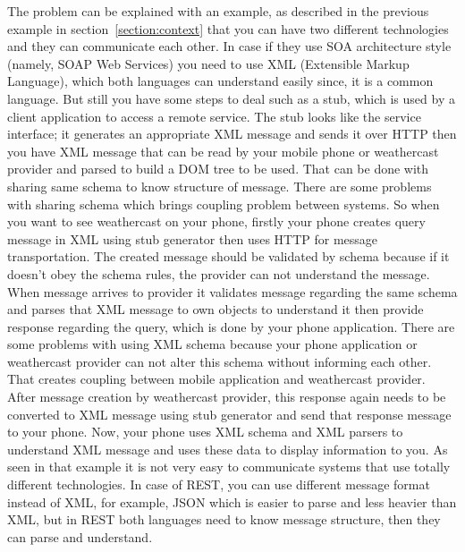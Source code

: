 The problem can be explained with an example, as described in the previous example in section \ref{section:context} that you can have two different technologies and they can communicate each other. In case if they use SOA architecture style (namely, SOAP Web Services) you need to use XML (Extensible Markup Language), which both languages can understand easily since, it is a common language. But still you have some steps to deal such as a stub, which is used by a client application to access a remote service. The stub looks like the service interface\citep{thesis:introduction3}; it generates an appropriate XML message and sends it over HTTP then you have XML message that can be read by your mobile phone or weathercast provider and parsed to build a DOM tree to be used. That can be done with sharing same schema to know structure of message. There are some problems with sharing schema which brings coupling problem between systems. So when you want to see weathercast on your phone, firstly your phone creates query message in XML using stub generator then uses HTTP for message transportation. The created message should be validated by schema because if it doesn't obey the schema rules, the provider can not understand the message. When message arrives to provider it validates message regarding the same schema and parses that XML message to own objects to understand it then provide response regarding the query, which is done by your phone application. There are some problems with using XML schema because your phone application or weathercast provider can not alter this schema without informing each other. That creates coupling between mobile application and weathercast provider. After message creation by weathercast provider, this response again needs to be converted to XML message using stub generator and send that response message to your phone. Now, your phone uses XML schema and XML parsers to understand XML message and uses these data to display information to you. As seen in that example it is not very easy to communicate systems that use totally different technologies. In case of REST, you can use different message format instead of XML, for example, JSON which is easier to parse and less heavier than XML, but in REST both languages need to know message structure, then they can parse and understand.

